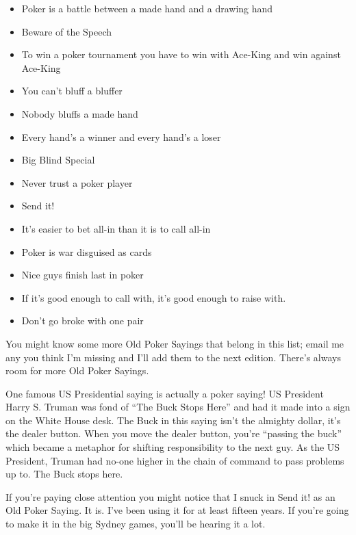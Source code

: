\begin{itemize}
  \item Poker is a battle between a made hand and a drawing hand
  \item Beware of the Speech
  \item To win a poker tournament you have to win with Ace-King and win
    against Ace-King
  \item You can't bluff a bluffer
  \item Nobody bluffs a made hand
  \item Every hand's a winner and every hand's a loser
  \item Big Blind Special
  \item Never trust a poker player
  \item Send it!
  \item It's easier to bet all-in than it is to call all-in
  \item Poker is war disguised as cards
  \item Nice guys finish last in poker
  \item If it's good enough to call with, it's good enough to raise with.
  \item Don't go broke with one pair
\end{itemize}

You might know some more Old Poker Sayings that belong in this list;
email me any you think I'm missing and I'll add them to the next
edition. There's always room for more Old Poker Sayings.

One famous US Presidential saying is actually a poker saying!
US President Harry S. Truman was fond of ``The Buck Stops Here'' and
had it made into a sign on the White House desk. The Buck in
this saying isn't the almighty dollar, it's the dealer button. When
you move the dealer button, you're ``passing the buck'' which became a
metaphor for shifting responsibility to the next guy. As the US
President, Truman had no-one higher in the chain of command to pass
problems up to. The Buck stops here.

If you're paying close attention you might notice that I snuck in
Send it! as an Old Poker Saying. It is. I've been using it for at
least fifteen years. If you're going to make it in the big Sydney
games, you'll be hearing it a lot.
